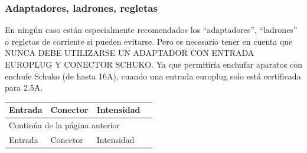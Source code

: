 \documentclass{article}
\begin{document}
\subsubsection{Adaptadores, ladrones, regletas}
\label{sec:org9f64a2e}
En ningún caso están especialmente recomendados los “adaptadores”, “ladrones” o regletas de corriente si pueden evitarse. Pero es necesario tener en cuenta que NUNCA DEBE UTILIZARSE UN ADAPTADOR CON ENTRADA EUROPLUG Y CONECTOR SCHUKO. Ya que permitiría enchufar aparatos con enchufe Schuko (de hasta 16A), cuando una entrada europlug solo está certificada para 2.5A.

\begin{longtable}{llll}
Entrada & Conector & Intensidad & \\
\hline
\endfirsthead
\multicolumn{4}{l}{Continúa de la página anterior} \\
\hline

Entrada & Conector & Intensidad &  \\


\end{longtable}
\end{document}

